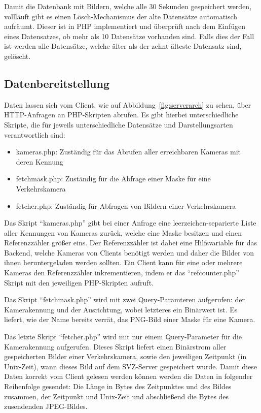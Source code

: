 Damit die Datenbank mit Bildern, welche alle 30 Sekunden gespeichert werden, vollläuft gibt es einen Lösch-Mechanismus der alte Datensätze automatisch aufräumt. 
Dieser ist in PHP implementiert und überprüft nach dem Einfügen eines Datensatzes, ob mehr als 10 Datensätze vorhanden sind.
Falls dies der Fall ist werden alle Datensätze, welche älter als der zehnt älteste Datensatz sind, gelöscht.

\subsection{Datenbereitstellung}
Daten lassen sich vom Client, wie auf Abbildung~\ref{fig:serverarch} zu sehen, über HTTP-Anfragen an PHP-Skripten abrufen. Es gibt hierbei unterschiedliche Skripte, die für jeweils unterschiedliche Datensätze und Darstellungsarten verantwortlich sind:
\begin{itemize}
\item{kameras.php: Zuständig für das Abrufen aller erreichbaren Kameras mit deren Kennung}
\item{fetchmask.php: Zuständig für die Abfrage einer Maske für eine Verkehrskamera}
\item{fetcher.php: Zuständig für Abfragen von Bildern einer Verkehrskamera}
\end{itemize}
Das Skript "`kameras.php"' gibt bei einer Anfrage eine leerzeichen-separierte Liste aller Kennungen von Kameras zurück, welche eine Maske besitzen und einen Referenzzähler größer eins. 
Der Referenzzähler ist dabei eine Hilfsvariable für das Backend, welche Kameras von Clients benötigt werden und daher die Bilder von ihnen heruntergeladen werden sollten.
Ein Client kann für eine oder mehrere Kameras den Referenzzähler inkrementieren, indem er das "`refcounter.php"' Skript mit den jeweiligen PHP-Skripten aufruft.

Das Skript "`fetchmask.php"' wird mit zwei Query-Paramteren aufgerufen: der Kamerakennung und der Ausrichtung, wobei letzteres ein Binärwert ist. 
Es liefert, wie der Name bereits verrät, das PNG-Bild einer Maske für eine Kamera.

Das letzte Skript "`fetcher.php"' wird mit nur einem Query-Parameter für die Kamerakennung aufgerufen. 
Dieses Skript liefert einen Binärstrom aller gespeicherten Bilder einer Verkehrskamera, sowie den jeweiligen Zeitpunkt (in Unix-Zeit), wann dieses Bild auf dem SVZ-Server gespeichert wurde. 
Damit diese Daten korrekt vom Client gelesen werden können werden die Daten in folgender Reihenfolge gesendet: Die Länge in Bytes des Zeitpunktes und des Bildes zusammen, der Zeitpunkt und Unix-Zeit und abschließend die Bytes des zusendenden JPEG-Bildes.
\newpage

